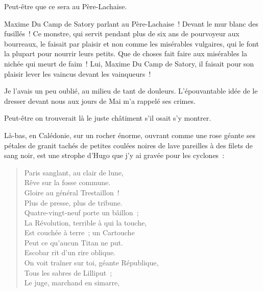 \documentclass[french,twoside]{book} %
\newcommand{\astertri}{\medskip\par\centerline{\color{rubric}\large\selectfont{\syms ✻\,✻\,✻}}\medskip\par}%
\newenvironment{quoteblock}%
  {\begin{quoting}}
  {\end{quoting}}
\newenvironment{quotebar}{%
    \def\FrameCommand{{\color{rubric!10!}\vrule width 0.5em} \hspace{0.9em}}%
    \def\OuterFrameSep{\itemsep} %
    \MakeFramed {\advance\hsize-\width \FrameRestore}
  }%
  {%
    \endMakeFramed
  }
\renewenvironment{quoteblock}%
  {%
    \savenotes
    \setstretch{0.9}
    \normalfont
    \begin{quotebar}
  }
  {%
    \end{quotebar}
    \spewnotes
  }
\begin{document}
\noindent Peut-être que ce sera au Père-Lachaise.\par
Maxime Du Camp de Satory parlant au Père-Lachaise ! Devant le mur blanc des fusillés ! Ce monstre, qui servit pendant plus de six ans de pourvoyeur aux bourreaux, le faisait par plaisir et non comme les misérables vulgaires, qui le font la plupart pour nourrir leurs petits. Que de  choses fait faire aux misérables la nichée qui meurt de faim ! Lui, Maxime Du Camp de Satory, il faisait pour son plaisir lever les vaincus devant les vainqueurs !\par
Je l’avais un peu oublié, au milieu de tant de douleurs. L’épouvantable idée de le dresser devant nous aux jours de Mai m’a rappelé ses crimes.\par
Peut-être on trouverait là le juste châtiment s’il osait s’y montrer.\par
Là-bas, en Calédonie, sur un rocher énorme, ouvrant comme une rose géante ses pétales de granit tachés de petites coulées noires de lave pareilles à des filets de sang noir, est une strophe d’Hugo que j’y ai gravée pour les cyclones :\par

\begin{quoteblock}

\astertri

\end{quoteblock}

\begin{verse}
\hspace{1em}Paris sanglant, au clair de lune,\\
\hspace{1em}Rêve sur la fosse commune.\\
\hspace{1em}Gloire au général Trestaillon !\\
\hspace{1em}Plus de presse, plus de tribune.\\
\hspace{1em}Quatre-vingt-neuf porte un bâillon ;\\
La Révolution, terrible à qui la touche,\\
\hspace{1em}Est couchée à terre ; un Cartouche\\
\hspace{1em}Peut ce qu’aucun Titan ne put.\\
\hspace{1em}Escobar rit d’un rire oblique.\\
On voit traîner sur toi, géante République,\\
\hspace{1em}Tous les sabres de Lilliput ;\\
\hspace{1em}Le juge, marchand en simarre,\\
\end{verse}
\begin{quoteblock}
 \end{quoteblock}
\end{document}

